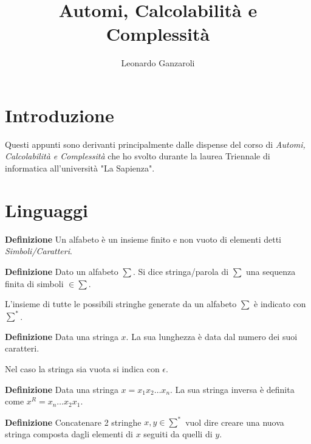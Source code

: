 \documentclass{article}
\title{Automi, Calcolabilità e Complessità}
\author{Leonardo Ganzaroli}
\date{}
\begin{document}
\maketitle


\tableofcontents

\newpage

\hypersetup{allcolors=black}

\section*{Introduzione}

Questi appunti sono derivanti principalmente dalle dispense del corso di \textit{Automi, Calcolabilità e Complessità} che ho svolto durante la laurea Triennale di informatica all'università "La Sapienza".

\newpage

\section{Linguaggi}

\textbf{Definizione} Un alfabeto è un insieme finito e non vuoto di elementi detti \textit{Simboli/Caratteri}.\newline

\noindent\textbf{Definizione} Dato un alfabeto $\sum$. Si dice stringa/parola di $\sum$ una sequenza finita di simboli $\in \sum$.\newline

\noindent L'insieme di tutte le possibili stringhe generate da un alfabeto $\sum$ è indicato con $\sum^*$.\newline

\noindent\textbf{Definizione} Data una stringa $x$. La sua lunghezza è data dal numero dei suoi caratteri.\newline

\noindent Nel caso la stringa sia vuota si indica con $\epsilon$.\newline

\noindent\textbf{Definizione} Data una stringa $x=x_1x_2\ldots x_n$. La sua stringa inversa è definita come  $x^R=x_n\ldots x_2x_1$.\newline

\noindent\textbf{Definizione} Concatenare 2 stringhe $x,y\in \sum^*$ vuol dire creare una nuova stringa composta dagli elementi di $x$ seguiti da quelli di $y$.\newline
\end{document}
